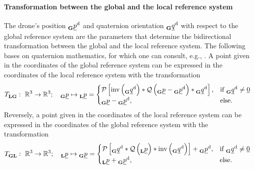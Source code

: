 \paragraph*{Transformation between the global and the local reference system} $\ $\\
The drone's position
$\pos[]{\drone}{}{\grs}{}$
and quaternion orientation
$\quat[]{\drone}{}{\grs}{}$
with respect to the global reference system
are the parameters that determine the bidirectional transformation
between the global and the local reference system.
The following bases on quaternion mathematics,
for which one can consult, e.g., \cite{Parent}.
A point given in the coordinates of the global reference system
can be expressed in the coordinates of the local reference system
with the transformation
\begin{align} \label{equ:global_to_local_transformation}
    \trafo[]{}{\lrs\grs}{}{}
    :\ 
    \mathbb{R}^3 \rightarrow \mathbb{R}^3
    ; \quad
    \pos[]{}{}{\grs}{} \mapsto \pos[]{}{}{\lrs}{}
    =
    \begin{cases}
        \mathcal{P} \left[
            \mathrm{inv} \left( \quat[]{\drone}{}{\grs}{} \right)
            *
            \mathcal{Q} \left( \pos[]{}{}{\grs}{} - \pos[]{\drone}{}{\grs}{} \right)
            *
            \quat[]{\drone}{}{\grs}{}
        \right], 
        & \text{if } \quat[]{\drone}{}{\grs}{} \ne \underline 0 \\
        \pos[]{}{}{\grs}{} - \pos[]{\drone}{}{\grs}{}, 
        & \text{else}.
    \end{cases}
\end{align}
Reversely, a point given in the coordinates of the local reference system
can be expressed in the coordinates of the global reference system
with the transformation
\begin{align} \label{eq:local_to_global_transformation}
    \trafo[]{}{\grs\lrs}{}{}
    :\ 
    \mathbb{R}^3 \rightarrow \mathbb{R}^3
    ; \quad
    \pos[]{}{}{\lrs}{} \mapsto \pos[]{}{}{\grs}{}
    =
    \begin{cases}
        \mathcal{P} \left[
            \quat[]{\drone}{}{\grs}{}
            *
            \mathcal{Q} \left( \pos[]{}{}{\lrs}{} \right)
            *
            \mathrm{inv} \left( \quat[]{\drone}{}{\grs}{} \right)
        \right] + \pos[]{\drone}{}{\grs}{}, 
        & \text{if } \quat[]{\drone}{}{\grs}{} \ne \underline 0 \\
        \pos[]{}{}{\lrs}{} + \pos[]{\drone}{}{\grs}{}, 
        & \text{else}.
    \end{cases}
\end{align}
